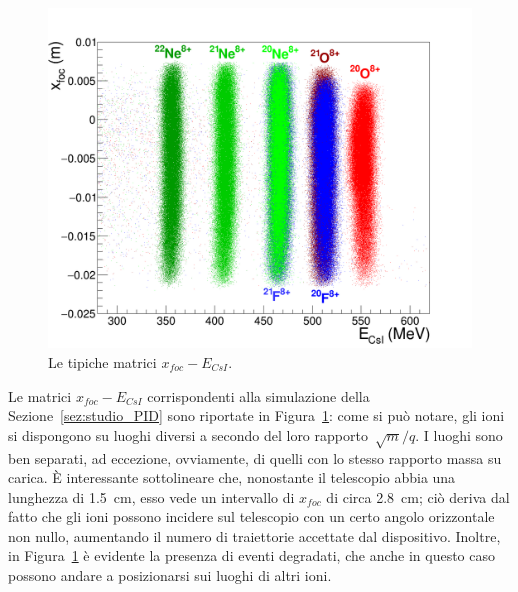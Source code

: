 \begin{figure} [!p]
	\centering
	\includegraphics[width=\textwidth, keepaspectratio]{Grafici_Tesi2/PIDnew/xf_csi_label_quadrata_menoeventi2.png}
	\caption{Le tipiche matrici $x_{foc} - E_{CsI}$.} \label{fig:xf_Ecsi}
\end{figure}

Le matrici $x_{foc} - E_{CsI}$ corrispondenti alla simulazione della Sezione~\ref{sez:studio_PID} sono riportate in Figura~\ref{fig:xf_Ecsi}: come si può notare, gli ioni si dispongono su luoghi diversi a secondo del loro rapporto~$\sqrt{m}/q$. 
I luoghi sono ben separati, ad eccezione, ovviamente, di quelli con lo stesso rapporto massa su carica.
È interessante sottolineare che, nonostante il telescopio abbia una lunghezza di 1.5~cm, esso vede un intervallo di $x_{foc}$ di circa 2.8~cm; ciò deriva dal fatto che gli ioni possono incidere sul telescopio con un certo angolo orizzontale non nullo, aumentando il numero di traiettorie accettate dal dispositivo.
Inoltre, in Figura~\ref{fig:xf_Ecsi} è evidente la presenza di eventi degradati, che anche in questo caso possono andare a posizionarsi sui luoghi di altri ioni.

